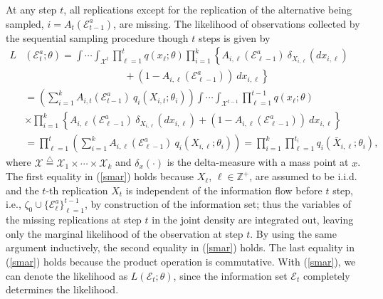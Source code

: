 \documentclass[journal]{IEEEtran}
\newcommand{\ed}{\stackrel{\triangle}{=}}
\begin{document}
 \begin{IEEEproof}
 At any step $t$, all replications except for the replication of the alternative being sampled, $i=A_t(\mathcal{E}_{t-1}^a)$, are missing.  The likelihood of observations collected by the sequential sampling procedure though $t$ steps is given by 
 \begin{equation}\label{smar}
 \begin{aligned}
L&(\mathcal{E}_t^a;\theta)=\int\cdots\int_{\mathcal{X}^t}\prod_{\ell=1}^{t} q(x_{\ell};\theta)\prod_{i=1}^{k}\left\{ A_{i,\ell}(\mathcal{E}_{\ell-1}^a)~\delta_{X_{i,\ell}} (d x_{i,\ell})\right.\\&\left.\qquad\qquad\qquad\qquad\qquad+(1-A_{i,\ell}(\mathcal{E}_{\ell-1}^a))~d x_{i,\ell}\right\}\\
&=\left(\sum_{i=1}^{k} A_{i,t} (\mathcal{E}_{t-1}^{a})~ q_i(X_{i,t};\theta_i)\right) \int\cdots\int_{\mathcal{X}^{t-1}}\prod_{\ell=1}^{t-1} q(x_{\ell};\theta)\\
&\times\prod_{i=1}^{k}\left\{ A_{i,\ell}(\mathcal{E}_{\ell-1}^a)~\delta_{X_{i,\ell}} (d x_{i,\ell})+(1-A_{i,\ell}(\mathcal{E}_{\ell-1}^a))~d x_{i,\ell}\right\}\\
 &=\prod_{\ell=1}^{t}\left(\sum_{i=1}^{k} A_{i,\ell} (\mathcal{E}_{\ell-1}^{a})~ q_i(X_{i,\ell};\theta_i)\right)=\prod_{i=1}^{k}\prod_{\ell=1}^{t_i} q_i(\bar{X}_{i,\ell};\theta_i),
 \end{aligned}
 \end{equation}
 where $\mathcal{X}\ed\mathcal{X}_1\times \cdots\times\mathcal{X}_k$ and $\delta_{x}(\cdot)$ is the delta-measure with a mass point at $x$. 
  The first equality in (\ref{smar}) holds because $X_{\ell}$, $\ell\in\mathbb{Z}^{+}$, are assumed to be i.i.d. and  the $t$-th replication $X_t$  is independent of the information flow before $t$ step, i.e., $\zeta_0\cup\{\mathcal{E}_{\ell}^a\}_{\ell=1}^{t-1}$, by  construction of the information set; thus the variables of the missing replications at step $t$ in the joint density are integrated out, leaving only the marginal likelihood of the observation at step $t$.  By using the same argument inductively, the second equality in (\ref{smar}) holds. The last equality in (\ref{smar}) holds because the product operation is commutative. 
With (\ref{smar}), we can denote the likelihood  as $L(\mathcal{E}_t;\theta)$, since the information set $\mathcal{E}_t$ completely determines the likelihood. 
  

\end{IEEEproof}
\end{document}
